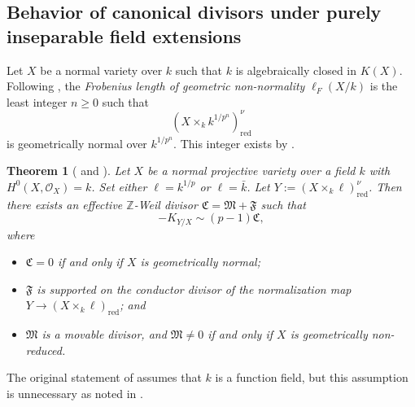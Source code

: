 \documentclass[10pt,abstract=true]{scrartcl}
\numberwithin{equation}{section}
\newtheorem{theorem}{Theorem}[section]
\theoremstyle{definition}
\theoremstyle{remark}
\begin{document}
\subsection{Behavior of canonical divisors under purely inseparable field extensions}\label{sec:geo-non-normal-base-change}%
Let $X$ be a normal variety over $k$ such that $k$ is algebraically closed in $K(X)$.
Following \cite[Definition~5.1]{tanaka_invariants_2021}, the \emph{Frobenius length of geometric non-normality} $\ell_F(X/k)$ is the least integer $n\geq0$ such that
\[
  (X\times_k{k^{1/p^n}})_{\mathrm{red}}^\nu
\]
is geometrically normal over $k^{1/p^n}$.
This integer exists by \cite[Remark~5.2]{tanaka_invariants_2021}.

\begin{theorem}[{\cite[Theorem~1.1]{tanaka_behavior_2018} and \cite[Theorem~1.1]{ji_structure_2021}}]\label{th:geonon-normal}%
  Let $X$ be a normal projective variety over a field $k$ with $H^0(X,\mathcal O_X) = k$.
  Set either $\ell = k^{1/p}$ or $\ell = \bar k$.
  Let $Y := (X \times_k \ell)_{\mathrm{red}}^\nu$.
  Then there exists an effective $\mathbb{Z}$-Weil divisor $\mathfrak C = \mathfrak M + \mathfrak F$ such that 
  \begin{equation}\label{eq:WR1Y}
    -K_{Y/X} \sim (p-1) \mathfrak C ,
  \end{equation}
  where
  \begin{itemize}
    \item $\mathfrak C = 0$ if and only if $X$ is geometrically normal;
    \item $\mathfrak{F}$ is supported on the conductor divisor of the normalization map $Y\to (X \times_k \ell)_{\mathrm{red}}$; and 
    \item $\mathfrak M$ is a movable divisor, and $\mathfrak M\ne0$ if and only if $X$ is geometrically non-reduced.
  \end{itemize}
\end{theorem}
The original statement of \cite[Theorem~1.1]{ji_structure_2021} assumes that $k$ is a function field, but this assumption is unnecessary as noted in \cite[page~3917]{Das-Waldron-2022}.
\end{document}
